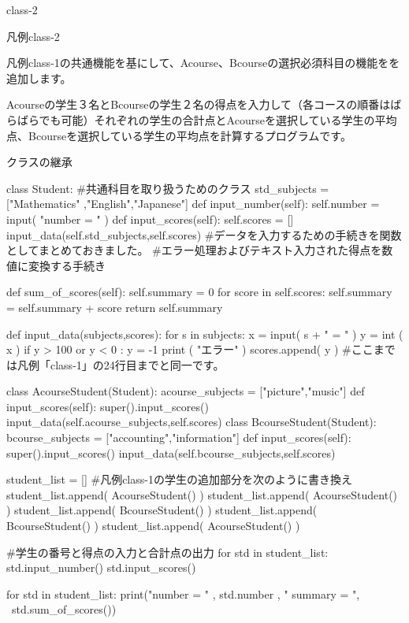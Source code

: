 \documentclass[11pt,a4paper,dvipdfmx,titlepage]{jsreport}
\begin{document}
\begin{pabox}{class-2}

凡例class-2

凡例class-1の共通機能を基にして、Acourse、Bcourseの選択必須科目の機能をを追加します。

Acourseの学生３名とBcourseの学生２名の得点を入力して（各コースの順番はばらばらでも可能）それぞれの学生の合計点とAcourseを選択している学生の平均点、Bcourseを選択している学生の平均点を計算するプログラムです。
\end{pabox}
\begin{codebox2}{クラスの継承}
\begin{listing}{1}

class Student: #共通科目を取り扱うためのクラス
    std_subjects = ["Mathematics" ,"English","Japanese"]
    def input_number(self):
            self.number = input( "number = " )
    def input_scores(self):
            self.scores = []
            input_data(self.std_subjects,self.scores)
        #データを入力するための手続きを関数としてまとめておきました。
        #エラー処理およびテキスト入力された得点を数値に変換する手続き

    def sum_of_scores(self):
            self.summary = 0
            for score in self.scores:
                self.summary = self.summary + score
        return self.summary

def input_data(subjects,scores):
    for s in subjects:
        x = input( s + " = " )
        y = int ( x )
        if y > 100 or y < 0 :
            y = -1
            print ( "エラー" )
        scores.append( y )
#ここまでは凡例「class-1」の24行目までと同一です。

class AcourseStudent(Student):
    acourse_subjects = ["picture","music"]
    def input_scores(self):
        super().input_scores()
        input_data(self.acourse_subjects,self.scores)
class BcourseStudent(Student):
    bcourse_subjects = ["accounting","information"]
    def input_scores(self):
        super().input_scores()
        input_data(self.bcourse_subjects,self.scores)

student_list = []
#凡例class-1の学生の追加部分を次のように書き換え
student_list.append( AcourseStudent() )
student_list.append( AcourseStudent() )
student_list.append( BcourseStudent() )
student_list.append( BcourseStudent() )
student_list.append( AcourseStudent() )

#学生の番号と得点の入力と合計点の出力
for std in student_list:
    std.input_number()
    std.input_scores()

for std in student_list:
    print("number = " , std.number , " summary = ", \
       std.sum_of_scores())
\end{listing}
\end{codebox2}
\end{document}
